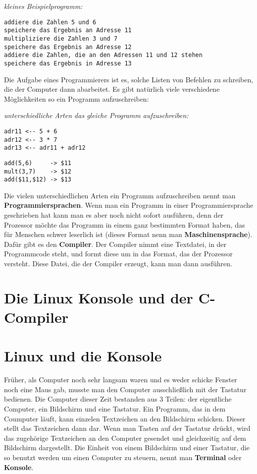 \documentclass[c_worksheet.tex]{subfiles}
\begin{document}
\textit{kleines Beispielprogramm:}
\begin{lstlisting}
addiere die Zahlen 5 und 6
speichere das Ergebnis an Adresse 11
multipliziere die Zahlen 3 und 7
speichere das Ergebnis an Adresse 12
addiere die Zahlen, die an den Adressen 11 und 12 stehen
speichere das Ergebnis in Adresse 13
\end{lstlisting}
\vspace{5pt}

Die Aufgabe eines Programmierers ist es, solche Listen von Befehlen zu schreiben, die der Computer dann abarbeitet. Es gibt natürlich viele verschiedene Möglichkeiten so ein Programm aufzuschreiben:\\
\vspace{5pt}

\textit{unterschiedliche Arten das gleiche Programm aufzuschreiben:}
\begin{multicols}{2}
\begin{lstlisting}
adr11 <-- 5 + 6
adr12 <-- 3 * 7
adr13 <-- adr11 + adr12
\end{lstlisting}
\begin{lstlisting}
add(5,6)     -> $11
mult(3,7)    -> $12
add($11,$12) -> $13
\end{lstlisting}
\end{multicols}
Die vielen unterschiedlichen Arten ein Programm aufzuschreiben nennt man \textbf{Programmiersprachen}. Wenn man ein Programm in einer Programmiersprache geschrieben hat kann man es aber noch nicht sofort ausführen, denn der Prozessor möchte das Programm in einem ganz bestimmten Format haben, das für Menschen schwer leserlich ist (dieses Format nenn man \textbf{Maschinensprache}). Dafür gibt es den \textbf{Compiler}. Der Compiler nimmt eine Textdatei, in der Programmcode steht, und formt diese um in das Format, das der Prozessor versteht. Diese Datei, die der Compiler erzeugt, kann man dann ausführen.

\newpage
\section{Die Linux Konsole und der C-Compiler}

\section{Linux und die Konsole}
Früher, als Computer noch sehr langsam waren und es weder schicke Fenster noch eine Maus gab, musste man den Computer ausschließlich mit der Tastatur bedienen.
Die Computer dieser Zeit bestanden aus 3 Teilen: der eigentliche Computer, ein Bildschirm und eine Tastatur.
Ein Programm, das in dem Coumputer läuft, kann einzelen Textzeichen an den Bildschirm schicken. Dieser stellt das Textzeichen dann dar.
Wenn man Tasten auf der Tastatur drückt, wird das zugehörige Textzeichen an den Computer gesendet und gleichzeitig auf dem Bildschirm dargestellt.
Die Einheit von einem Bildschirm und einer Tastatur, die so benutzt werden um einen Computer zu steuern, nennt man \textbf{Terminal} oder \textbf{Konsole}.\\
\end{document}
